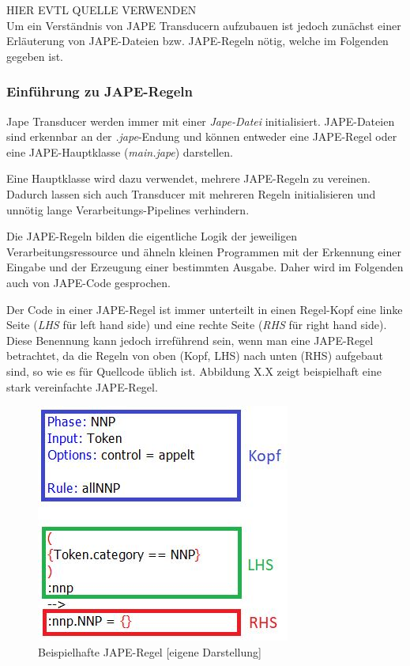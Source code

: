 \documentclass[12pt]{report}
\begin{document}
HIER EVTL QUELLE VERWENDEN\\

Um ein Verständnis von JAPE Transducern aufzubauen ist jedoch zunächst einer Erläuterung von JAPE-Dateien bzw. JAPE-Regeln nötig, welche im Folgenden gegeben ist.

\subsubsection{Einführung zu JAPE-Regeln}
Jape Transducer werden immer mit einer \textit{Jape-Datei} initialisiert. JAPE-Dateien sind erkennbar an der \textit{.jape}-Endung und können entweder eine JAPE-Regel oder eine JAPE-Hauptklasse (\textit{main.jape}) darstellen. 

Eine Hauptklasse wird dazu verwendet, mehrere JAPE-Regeln zu vereinen. Dadurch lassen sich auch Transducer mit mehreren Regeln initialisieren und unnötig lange Verarbeitungs-Pipelines verhindern. 

Die JAPE-Regeln bilden die eigentliche Logik der jeweiligen Verarbeitungsressource und ähneln kleinen Programmen mit der Erkennung einer Eingabe und der Erzeugung einer bestimmten Ausgabe. Daher wird im Folgenden auch von JAPE-Code gesprochen. 

Der Code in einer JAPE-Regel ist immer unterteilt in einen Regel-Kopf eine linke Seite (\textit{LHS} für left hand side) und eine rechte Seite (\textit{RHS} für right hand side). Diese Benennung kann jedoch irreführend sein, wenn man eine JAPE-Regel betrachtet, da die Regeln von oben (Kopf, LHS) nach unten (RHS) aufgebaut sind, so wie es für Quellcode üblich ist. Abbildung X.X zeigt beispielhaft eine stark vereinfachte JAPE-Regel.

\begin{figure}[H]
\begin{center}
\includegraphics[scale=1]{Bilder/Regel-Bsp.png}
\caption{Beispielhafte JAPE-Regel [eigene Darstellung]}
\end{center}
\end{figure}
\end{document}
